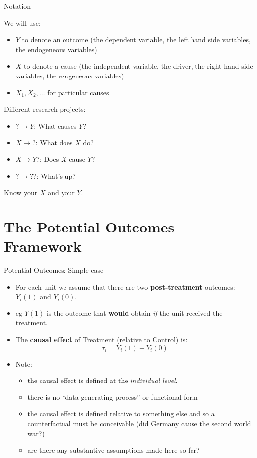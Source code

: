 \documentclass[11pt,ignorenonframetext,]{beamer}
\providecommand{\tightlist}{%
  \setlength{\itemsep}{0pt}\setlength{\parskip}{0pt}}
\begin{document}
\begin{frame}{Notation}

We will use:

\begin{itemize}
\item
  \(Y\) to denote an outcome (the dependent variable, the left hand side
  variables, the endogeneous variables)
\item
  \(X\) to denote a cause (the independent variable, the driver, the
  right hand side variables, the exogeneous variables)
\item
  \(X_1, X_2, \dots\) for particular causes
\end{itemize}

Different research projects:

\begin{itemize}
\tightlist
\item
  \(? \rightarrow Y\): What causes \(Y\)?
\item
  \(X \rightarrow ?\): What does \(X\) do?
\item
  \(X \rightarrow Y ?\): Does \(X\) cause \(Y\)?
\item
  \(? \rightarrow ? ?\): What's up?
\end{itemize}

Know your \(X\) and your \(Y\).

\end{frame}

\section{The Potential Outcomes
Framework}\label{the-potential-outcomes-framework}

\begin{frame}{Potential Outcomes: Simple case}

\begin{itemize}
    \item For each unit we assume that there are two \textbf{post-treatment} outcomes: $Y_i(1)$ and $Y_i(0)$. 
    \item eg $Y(1)$ is the outcome that \textbf{would} obtain \textit{if} the unit received the treatment. 
    \item  The \textbf{causal effect }of Treatment (relative to Control) is:
    $$ \tau_i = Y_i(1) - Y_i(0)$$
    \item Note: 
    
\begin{itemize}
    \item the causal effect is defined at the \textit{individual level}. 
    \item there is no ``data generating process'' or functional form 
    \item the causal effect is defined relative to something else and so a counterfactual must be conceivable (did Germany cause the second world war?)
    \item are there any substantive assumptions made here so far?
\end{itemize}
\end{itemize}

\end{frame}
\end{document}
